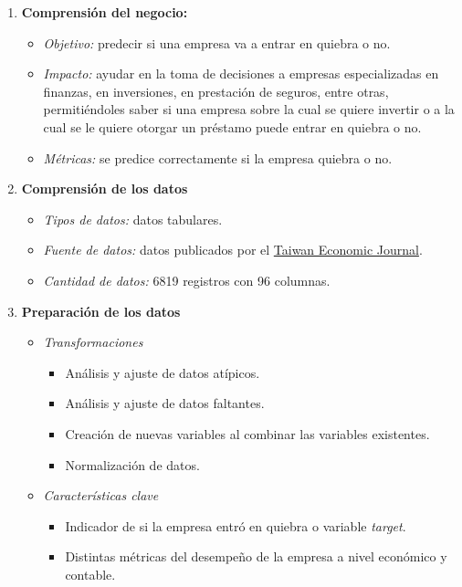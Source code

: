\documentclass[
11pt, %
]{charter}
\begin{document}
\begin{enumerate}
  \item \textbf{Comprensión del negocio:}
    \begin{itemize}
        \item \textit{Objetivo:} predecir si una empresa va a entrar en quiebra o no.
        \item \textit{Impacto:} ayudar en la toma de decisiones a empresas especializadas en finanzas, en inversiones, en prestación de seguros, entre otras, permitiéndoles saber si una empresa sobre la cual se quiere invertir o a la cual se le quiere otorgar un préstamo puede entrar en quiebra o no.
        \item \textit{Métricas:} se predice correctamente si la empresa quiebra o no.
    \end{itemize}
  \item \textbf{Comprensión de los datos}
    \begin{itemize}
        \item \textit{Tipos de datos:} datos tabulares.
        \item \textit{Fuente de datos:} datos publicados por el \href{https://www.tejwin.com/en/}{Taiwan Economic Journal}.
        \item \textit{Cantidad de datos:} 6819 registros con 96 columnas.
    \end{itemize}
  \item \textbf{Preparación de los datos}
    \begin{itemize}
        \item \textit{Transformaciones}
            \begin{itemize}
                \item Análisis y ajuste de datos atípicos.
                \item Análisis y ajuste de datos faltantes.
                \item Creación de nuevas variables al combinar las variables existentes.
                \item Normalización de datos.
            \end{itemize}
        \item \textit{Características clave}
            \begin{itemize}
                \item Indicador de si la empresa entró en quiebra o variable \textit{target}.
                \item Distintas métricas del desempeño de la empresa a nivel económico y contable.

\end{itemize}
\end{itemize}
\end{enumerate}
\end{document}
